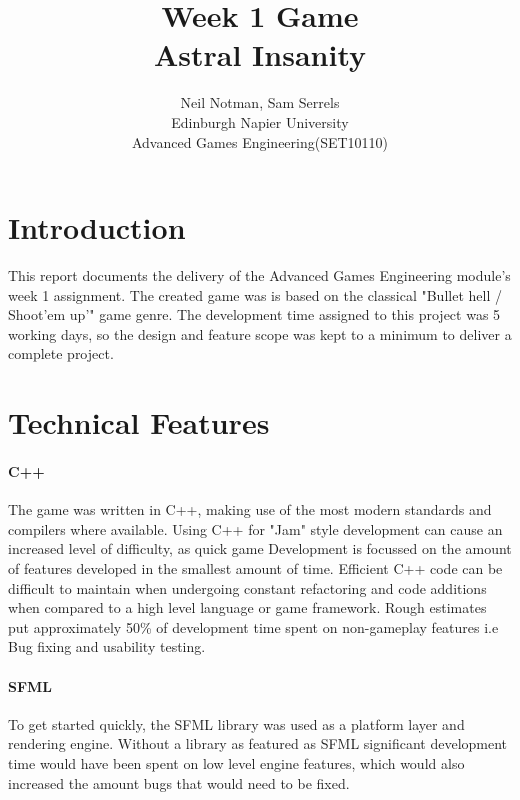 \documentclass[conference,backref=page]{acmsiggraph}
\title{Week 1 Game\\
	   Astral Insanity}
\author{Neil Notman, Sam Serrels \\
Edinburgh Napier University\\
Advanced Games Engineering(SET10110)}
\begin{document}

\maketitle


\section{Introduction}

This report documents the delivery of the Advanced Games Engineering module's week 1 assignment. The created game was is based on the classical "Bullet hell / Shoot'em up'" game genre. The development time assigned to this project was 5 working days, so the design and feature scope was kept to a minimum to deliver a complete project.

\section{Technical Features}
\paragraph{C++ }
The game was written in C++, making use of the most modern standards and compilers where available. Using C++ for "Jam" style development can cause an increased level of difficulty, as quick game Development is focussed on the amount of features developed in the smallest amount of time. Efficient C++ code can be difficult to maintain when undergoing constant refactoring and code additions when compared to a high level language or game framework. Rough estimates put approximately 50\% of development time spent on non-gameplay features i.e Bug fixing and usability testing.

\paragraph{SFML}
To get started quickly, the SFML library was used as a platform layer and rendering engine. Without a library as featured as SFML significant development time would have been spent on low level engine features, which would also increased the amount bugs that would need to be fixed.
\end{document}
